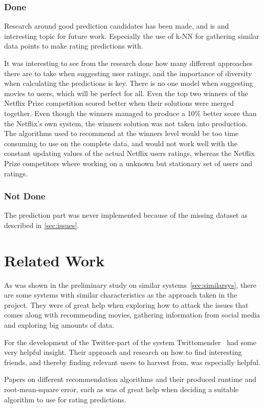 \subsubsection{Done}
Research around good prediction candidates has been made, and is and interesting topic for future work. Especially the use of k-NN for gathering similar data points to make rating predictions with.

It was interesting to see from the research done how many different approaches there are to take when suggesting user ratings, and the importance of diversity when calculating the predictions is key. There is no one model when suggesting movies to users, which will be perfect for all. Even the top two winners of the Netflix Prize competition scored better when their solutions were merged together. Even though the winners managed to produce a 10\% better score than the Netflix's own system, the winners solution was not taken into production. The algorithms used to recommend at the winners level would be too time consuming to use on the complete data, and would not work well with the constant updating values of the actual Netflix users ratings, whereas the Netflix Prize competitors where working on a unknown but stationary set of users and ratings.

\subsubsection{Not Done}
The prediction part was never implemented because of the missing dataset as described in \ref{sec:issues}.


\section{Related Work}
As was shown in the preliminary study on similar systems~\ref{sec:similarsys}, there are some systems with similar characteristics as the approach taken in the project. They were of great help when exploring how to attack the issues that comes along with recommending movies, gathering information from social media and exploring big amounts of data.

For the development of the Twitter-part of the system Twittomender~\cite{twittomender} had some very helpful insight. Their approach and research on how to find interesting friends, and thereby finding relevant users to harvest from, was especially helpful.

Papers on different recommendation algorithms and their produced runtime and root-mean-square error, such as \cite{bigchaos-sol,alsMPI,BellKor-CF-TD} was of great help when deciding a suitable algorithm to use for rating predictions.


